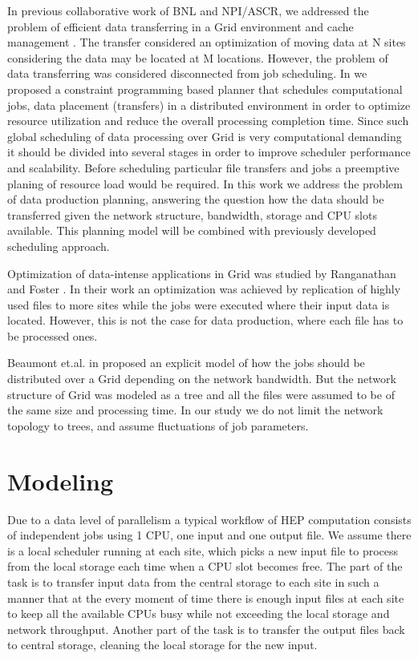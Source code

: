 In previous collaborative work of BNL and NPI/ASCR, we addressed the problem of efficient data transferring in a Grid environment \cite{Zerola} and cache management \cite{Makatun:cache}. The transfer considered an optimization of moving data at N sites considering the data may be located at M locations. However, the problem of data transferring was considered disconnected from job scheduling. In \cite{ACAT 2014} we proposed a constraint programming based planner that schedules computational jobs, data placement (transfers) in a distributed environment in order to optimize resource utilization and reduce the overall processing completion time. Since such global scheduling of data processing over Grid is very computational demanding it should be divided into several stages in order to improve scheduler performance and scalability. Before scheduling particular file transfers and jobs a preemptive planing of resource load would be required. In this work we address the problem of data production planning, answering the question how the data should be transferred given the network structure, bandwidth, storage and CPU slots available. This planning model will be combined with previously developed scheduling approach.

Optimization of data-intense applications in Grid was studied by Ranganathan and Foster \cite{Globus: scheduler}. In their work an optimization was achieved by replication of highly used files to more sites while the jobs were executed where their input data is located. However, this is not the case for data production, where each file has to be processed ones. 

Beaumont et.al. in \cite{Trees} proposed an explicit model of how the jobs should be distributed over a Grid depending on the network bandwidth. But the network structure of Grid was modeled as a tree and all the files were assumed to be of the same size and processing time. In our study we do not limit the network topology to trees, and assume fluctuations of job parameters. 

\section{Modeling}
\label{modeling}
Due to a data level of parallelism a typical workflow of HEP computation consists of independent jobs using 1 CPU, one input and one output file. We assume there is a local scheduler running at each site, which picks a new input file to process from the local storage each time when a CPU slot becomes free. The part of the task is to transfer input data from the central storage to each site in such a manner that at the every moment of time there is enough input files at each site to keep all the available CPUs busy while not exceeding the local storage and network throughput. Another part of the task is to transfer the output files back to central storage, cleaning the local storage for the new input.

